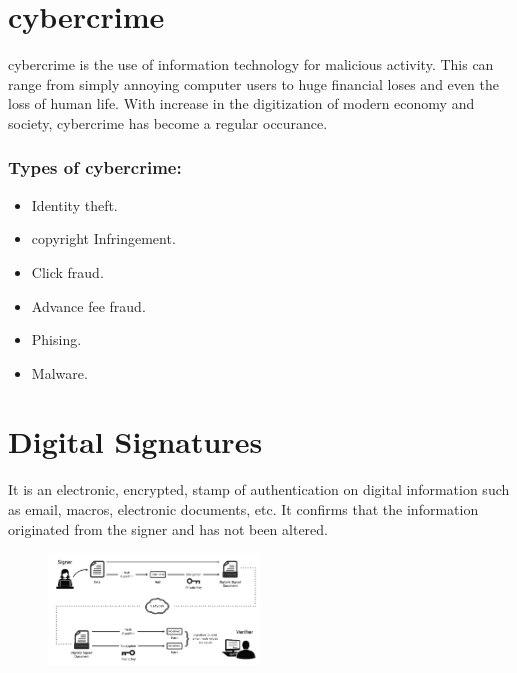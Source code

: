 \documentclass[12pt, a4paper]{article}
\begin{document}
\section{cybercrime}%
cybercrime is the use of information technology for malicious activity. This 
can range from simply annoying computer users to huge financial loses and even
the loss of human life. With increase in the digitization of modern economy
and society, cybercrime has become a regular occurance.
\subsubsection*{Types of cybercrime:}%
\begin{itemize}
  \item Identity theft.
  \item copyright Infringement.
  \item Click fraud.
  \item Advance fee fraud.
  \item Phising.
  \item Malware.
\end{itemize}%

\section{Digital Signatures}%
It is an electronic, encrypted, stamp of authentication on digital information
such as email, macros, electronic documents, etc. It confirms that the
information originated from the signer and has not been altered.
\begin{figure}[h]
  \centering
  \includegraphics[width=0.5\textwidth]{key}
\end{figure}
\end{document}
